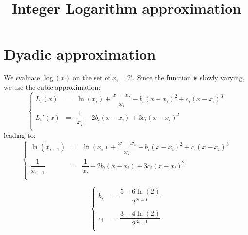 \documentclass[aps]{revtex4}
\begin{document}
\title{Integer Logarithm approximation}
\maketitle

\section{Dyadic approximation}
We evaluate $\log(x)$ on the set of $x_i=2^i$.
Since the function is slowly varying, we use the cubic approximation:
\begin{equation}
\left\lbrace
\begin{array}{rcl}
	L_i(x)  & = & \ln(x_i) + \dfrac{x-x_i}{x_i} - b_i \left(x-x_i\right)^2 + c_i \left(x-x_i\right)^3\\
	L_i'(x) & = & \dfrac{1}{x_i} - 2b_i \left(x-x_i\right) + 3 c_i  \left(x-x_i\right)^2 \\
\end{array}
\right.
\end{equation}
leading to:
\begin{equation}
\left\lbrace
\begin{array}{rcl}
	\ln(x_{i+1})       & = & \ln(x_i) + \dfrac{x-x_i}{x_i} - b_i \left(x-x_i\right)^2 + c_i \left(x-x_i\right)^3\\
	\dfrac{1}{x_{i+1}} & = & \dfrac{1}{x_i} - 2b_i \left(x-x_i\right) + 3 c_i  \left(x-x_i\right)^2 \\
\end{array}
\right.
\end{equation}

\begin{equation}
\left\lbrace
\begin{array}{rcl}
b_i  & = & \dfrac{5-6\ln(2)}{2^{2i+1}}\\
\\
c_ i & = & \dfrac{3-4\ln(2)}{2^{3i+1}}\\
\end{array}
\right.
\end{equation}
\end{document}
